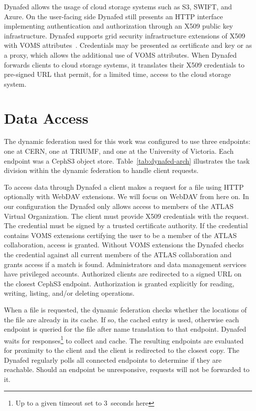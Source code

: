 \documentclass[a4paper]{jpconf}
\begin{document}
Dynafed allows the usage of cloud storage systems such as S3, SWIFT, and Azure. On the user-facing side Dynafed still presents an HTTP interface implementing authentication and authorization through an X509 public key infrastructure. Dynafed supports grid security infrastructure extensions of X509 with VOMS attributes~\cite{voms}. Credentials may be presented as certificate and key or as a proxy, which allows the additional use of VOMS attributes. When Dynafed forwards clients to cloud storage systems, it translates their X509 credentials to pre-signed URL that permit, for a limited time, access to the cloud storage system.

\section{Data Access}
The dynamic federation used for this work was configured to use three endpoints: one at CERN, one at TRIUMF, and one at the University of Victoria. Each endpoint was a CephS3 object store. Table~\ref{tab:dynafed-arch} illustrates the task division within the dynamic federation to handle client requests.

To access data through Dynafed a client makes a request for a file using HTTP optionally with WebDAV extensions.
We will focus on WebDAV from here on. In our configuration the Dynafed only allows access to members of the ATLAS Virtual Organization. The client must provide X509 credentials with the request. The credential must be signed by a trusted certificate authority. If the credential contains VOMS extensions certifying the user to be a member of the ATLAS collaboration, access is granted. Without VOMS extensions the Dynafed checks the credential against all current members of the ATLAS collaboration and grants access if a match is found. Administrators and data management services have privileged accounts. Authorized clients are redirected to a signed URL on the closest CephS3 endpoint. Authorization is granted explicitly for reading, writing, listing, and/or deleting operations.

When a file is requested, the dynamic federation checks whether the locations of the file are already in its cache. If so, the cached entry is used, otherwise each endpoint is queried for the file after name translation to that endpoint. Dynafed waits for responses\footnote{Up to a given timeout set to 3~seconds here} to collect and cache. The resulting endpoints are evaluated for proximity to the client and the client is redirected to the closest copy. The Dynafed regularly polls all connected endpoints to determine if they are reachable. Should an endpoint be unresponsive, requests will not be forwarded to it.
\end{document}
